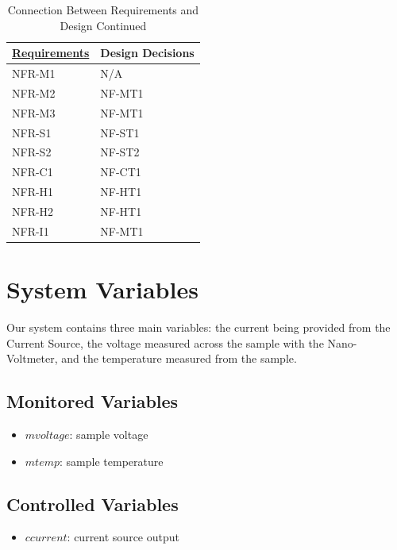 \documentclass[12pt, titlepage]{article}
\begin{document}
\begin{table}[H]
	\centering
	\caption{Connection Between Requirements and Design Continued}
	\label{my-label}
	\begin{tabular}{p{} p{}}
		\hline
		\textbf{\href{https://github.com/edwin-do/capstoneTeam30/blob/main/docs/SRS/SRS.pdf}{Requirements}} & \textbf{Design Decisions} \\ \hline
         NFR-M1 & N/A \\ \hline
	    NFR-M2 & NF-MT1 \\ \hline
	    NFR-M3 & NF-MT1 \\ \hline
	    NFR-S1 & NF-ST1 \\ \hline
	    NFR-S2 & NF-ST2 \\ \hline
	    NFR-C1 & NF-CT1 \\ \hline
	    NFR-H1 & NF-HT1 \\ \hline
	    NFR-H2 & NF-HT1 \\ \hline
	    NFR-I1 & NF-MT1 \\ \hline
	\end{tabular}
\end{table}

\newpage

\section{System Variables}

\noindent Our system contains three main variables: the current being provided from the Current Source, the voltage measured across the sample with the Nano-Voltmeter, and the temperature measured from the sample.

\subsection{Monitored Variables}
	\begin{itemize}
		\item $m$\textunderscore $voltage$: sample voltage
		\item $m$\textunderscore $temp$: sample temperature
	\end{itemize}

\subsection{Controlled Variables}
\begin{itemize}
		\item $c$\textunderscore $current$: current source output
	\end{itemize}
\end{document}
